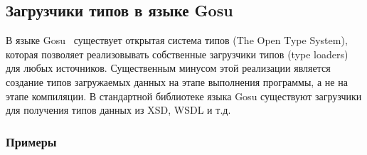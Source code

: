 \subsection{Загрузчики типов в языке Gosu}\label{gosu-type-loaders}
В языке Gosu~\cite{gosuguide} существует открытая система типов (The Open Type System), которая позволяет реализовывать собственные загрузчики типов (type loaders) для любых источников.
Существенным минусом этой реализации является создание типов загружаемых данных на этапе выполнения программы, а не на этапе компиляции.
В стандартной библиотеке языка Gosu существуют загрузчики для получения типов данных из XSD, WSDL и т.д.

\subsubsection{Примеры}

